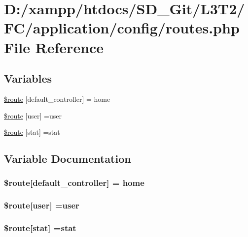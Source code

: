 \hypertarget{routes_8php}{}\section{D\+:/xampp/htdocs/\+S\+D\+\_\+\+Git/\+L3\+T2/\+F\+C/application/config/routes.php File Reference}
\label{routes_8php}
\subsection*{Variables}
\begin{DoxyCompactItemize}
\item 
\hyperlink{routes_8php_a6c2a82e4cec825eb1921141d08af834b}{\$route} \mbox{[}\textquotesingle{}default\+\_\+controller\textquotesingle{}\mbox{]} = \textquotesingle{}home\textquotesingle{}
\item 
\hyperlink{routes_8php_aa8496714b32f3c34d6f32113ad7927de}{\$route} \mbox{[}\textquotesingle{}user\textquotesingle{}\mbox{]} =\textquotesingle{}user\textquotesingle{}
\item 
\hyperlink{routes_8php_a209acc2bed9bf0fe6f3eae47655889d3}{\$route} \mbox{[}\textquotesingle{}stat\textquotesingle{}\mbox{]} =\textquotesingle{}stat\textquotesingle{}
\end{DoxyCompactItemize}


\subsection{Variable Documentation}
\hypertarget{routes_8php_a6c2a82e4cec825eb1921141d08af834b}{}
\subsubsection[{\$route}]{\setlength{\rightskip}{0pt plus 5cm}\$route\mbox{[}\textquotesingle{}default\+\_\+controller\textquotesingle{}\mbox{]} = \textquotesingle{}home\textquotesingle{}}\label{routes_8php_a6c2a82e4cec825eb1921141d08af834b}
\hypertarget{routes_8php_aa8496714b32f3c34d6f32113ad7927de}{}
\subsubsection[{\$route}]{\setlength{\rightskip}{0pt plus 5cm}\$route\mbox{[}\textquotesingle{}user\textquotesingle{}\mbox{]} =\textquotesingle{}user\textquotesingle{}}\label{routes_8php_aa8496714b32f3c34d6f32113ad7927de}
\hypertarget{routes_8php_a209acc2bed9bf0fe6f3eae47655889d3}{}
\subsubsection[{\$route}]{\setlength{\rightskip}{0pt plus 5cm}\$route\mbox{[}\textquotesingle{}stat\textquotesingle{}\mbox{]} =\textquotesingle{}stat\textquotesingle{}}\label{routes_8php_a209acc2bed9bf0fe6f3eae47655889d3}
